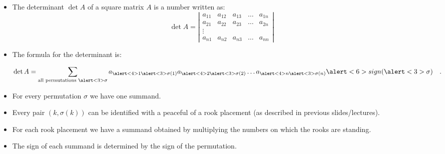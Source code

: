 \begin{frame}

\begin{itemize}
\item The determinant $\det A$ of a square matrix $A$ is a number written as:
\[
\det A= \left|\begin{array}{ccccc}
a_{11} & a_{12} & a_{13}& \dots & a_{1n}\\
a_{21} & a_{22} & a_{23}& \dots & a_{2n}\\
\vdots \\
a_{n1} & a_{n2} & a_{n3}& \dots & a_{nn}
\end{array} \right|
\]
\item<2-> The formula for the determinant is:

\[\det A=\sum_{\text{all permutations }\alert<3>{\sigma}} a_{\alert<4>{1\alert<3>{\sigma}(1)}} a_{\alert<4>{2\alert<3>{\sigma}(2)}} \dots a_{\alert<4>{n\alert<3>{\sigma}(n)}} \alert<6>{ sign(\alert<3>{\sigma})} \quad .
\]
\item<3-> For every permutation $\sigma$ we have one summand.
\item<4-> Every pair $(k,\sigma(k))$ can be identified with a peaceful of a rook placement (as described in previous slides/lectures).
\item<5-> For each rook placement we have a summand obtained by multiplying the numbers on which the rooks are standing.
\item<6-> The sign of each summand is determined by the sign of the permutation.
\end{itemize}

\vskip 10cm
\end{frame}
